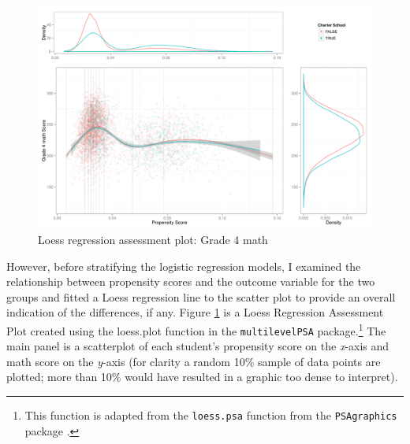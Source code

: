 \documentclass[letterpaper,12p,twoside]{article} %
\begin{document}
\begin{figure}[t]
\begin{center}
\includegraphics[width=\textwidth]{../Figures2009/g4math-loess.pdf}
\caption{Loess regression assessment plot: Grade 4 math}
\label{fig:g4math:loess}
\end{center}
\end{figure}

However, before stratifying the logistic regression models, I examined the relationship between propensity scores and the outcome variable for the two groups and fitted a Loess regression line to the scatter plot to provide an overall indication of the differences, if any. Figure \ref{fig:g4math:loess} is a Loess Regression Assessment Plot created using the loess.plot function in the \texttt{multilevelPSA} package.\footnote{This function is adapted from the \texttt{loess.psa} function from the \texttt{PSAgraphics} package \cite{HelmreichPruzek2009}.} The main panel is a scatterplot of each student's propensity score on the \textit{x}-axis and math score on the \textit{y}-axis (for clarity a random 10\% sample of data points are plotted; more than 10\% would have resulted in a graphic too dense to interpret). 

\end{document}
